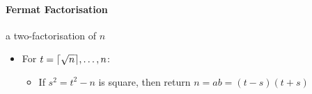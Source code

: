 \paragraph{Fermat Factorisation}
a two-factorisation of \(n\)
\begin{itemize}
    \item For \(t = \lceil {\sqrt{n}} \rceil, \dots, n\):
          \begin{itemize}
              \item If \(s^2 = t^2 - n\) is square, then return \(n = ab = (t -s)(t + s)\)
          \end{itemize}
\end{itemize}

\newpage